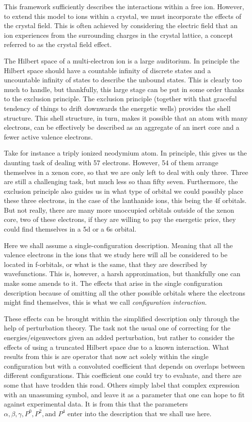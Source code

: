 \documentclass{article}
\begin{document}
This framework sufficiently describes the interactions within a free ion. However, to extend this model to ions within a crystal, we must incorporate the effects of the crystal field. This is often achieved by considering the electric field that an ion experiences from the surrounding charges in the crystal lattice, a concept referred to as the crystal field effect.

The Hilbert space of a multi-electron ion is a large auditorium. In principle the Hilbert space should have a countable infinity of discrete states and a uncountable infinity of states to describe the unbound states. This is clearly too much to handle, but thankfully, this large stage can be put in some order thanks to the exclusion principle. The exclusion principle (together with that graceful tendency of things to drift downwards the energetic wells) provides the shell structure. This shell structure, in turn, makes it possible that an atom with many electrons, can be effectively be described as an aggregate of an inert core and a fewer active valence electrons.  

Take for instance a triply ionized neodymium atom. In principle, this gives us the daunting task of dealing with 57 electrons. However, 54 of them arrange themselves in a xenon core, so that we are only left to deal with only three. Three are still a challenging task, but much less so than fifty seven. Furthermore, the exclusion principle also guides us in what type of orbital we could possibly place these three electrons, in the case of the lanthanide ions, this being the 4f orbitals. But not really, there are many more unoccupied orbitals outside of the xenon core, two of these electrons, if they are willing to pay the energetic price, they could find themselves in a 5d or a 6s orbital.  

Here we shall assume a single-configuration description. Meaning that all the valence electrons in the ions that we study here will all be considered to be located in f-orbitals, or what is the same, that they are described by \fn wavefunctions. This is, however, a harsh approximation, but thankfully one can make some amends to it. The effects that arise in the single configuration description because of omitting all the other possible orbitals where the electrons might find themselves, this is what we call \textit{configuration interaction}. 

These effects can be brought within the simplified description only through the help of perturbation theory. The task not the usual one of correcting for the energies/eigenvectors given an added perturbation, but rather to consider the effects of using a truncated Hilbert space due to a known interaction. What results from this is are operator that now act solely within the single configuration but with a convoluted coefficient that depends on overlaps between different configurations. This  coefficient one could try to evaluate, and there are some that have trodden this road. Others simply label that complex expression with an unassuming symbol, and leave it as a parameter that one can hope to fit against experimental data. It is from this that the parameters $\alpha, \beta, \gamma, P^0, P^2, \text{and } P^4$ enter into the description that we shall use here. 
\end{document}

